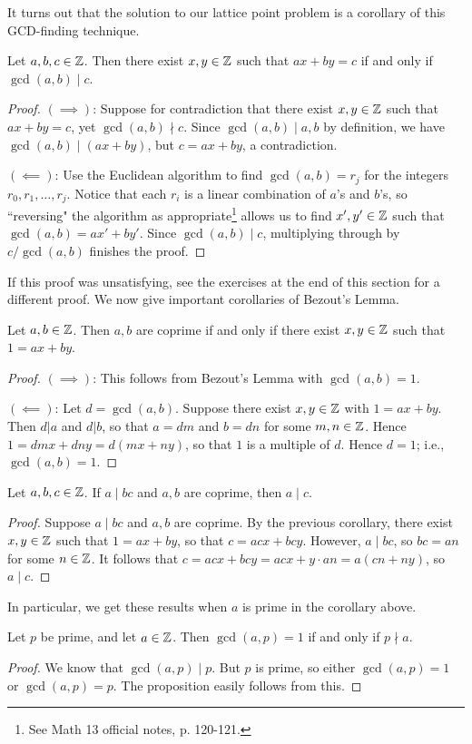 \documentclass{article}
\begin{document}
It turns out that the solution to our lattice point problem is a corollary of this GCD-finding technique.
\begin{theorem}
Let $a,b,c\in \mathbb Z$. Then there exist $x,y\in\mathbb Z$ such that $ax + by = c$ if and only if $\gcd(a,b) \mid c$.
\end{theorem}
\begin{proof}
$(\implies)$: Suppose for contradiction that there exist $x,y\in\mathbb Z$ such that $ax+by= c$, yet $\gcd(a,b) \nmid c$. Since $\gcd(a,b)\mid a,b$ by definition, we have $\gcd(a,b)\mid (ax + by)$, but $c=ax+by$, a contradiction.

$(\impliedby)$: Use the Euclidean algorithm to find $\gcd(a,b) = r_j$ for the integers $r_0, r_1, \ldots, r_j$. Notice that each $r_i$ is a linear combination of $a$'s and $b$'s, so ``reversing" the algorithm as appropriate\footnote{See Math 13 official notes, p. 120-121.} allows us to find $x',y'\in \mathbb Z$ such that $\gcd(a,b) = ax'+by'$. Since $\gcd(a,b)\mid c$, multiplying through by $c/\gcd(a,b)$ finishes the proof.
\end{proof}

If this proof was unsatisfying, see the exercises at the end of this section for a different proof. We now give important corollaries of Bezout's Lemma.

\begin{corollary}
Let $a,b\in\mathbb Z$. Then $a,b$ are coprime if and only if there exist $x,y\in\mathbb Z$ such that $1 = ax+by$.
\end{corollary}
\begin{proof}
$(\implies)$: This follows from Bezout's Lemma with $\gcd(a,b) = 1$.

$(\impliedby)$: Let $d = \gcd(a,b)$. Suppose there exist $x,y\in\mathbb Z$ with $1 = ax + by$. Then $d|a$ and $d|b$, so that $a = dm$ and $b=dn$ for some $m,n \in\mathbb Z$. Hence $1 = dmx + dny = d(mx + ny)$, so that $1$ is a multiple of $d$. Hence $d=1$; i.e., $\gcd(a,b) = 1$.
\end{proof}

\begin{corollary}\label{euclid1}
Let $a,b,c\in\mathbb Z$. If $a \mid bc$ and $a,b$ are coprime, then $a\mid c$.
\end{corollary}
\begin{proof}
Suppose $a\mid bc$ and $a,b$ are coprime. By the previous corollary, there exist $x,y\in\mathbb Z$ such that $1 = ax + by$, so that $c = acx + bcy$. However, $a\mid bc$, so $bc = an$ for some $n\in\mathbb Z$. It follows that $c = acx  +bcy = acx + y\cdot an = a(cn + ny)$, so $a\mid c$.
\end{proof}
In particular, we get these results when $a$ is prime in the corollary above.
\begin{proposition}
Let $p$ be prime, and let $a\in\mathbb Z$. Then $\gcd(a, p) = 1$ if and only if $p\nmid a$.
\end{proposition}
\begin{proof}
We know that $\gcd(a, p) \mid p$. But $p$ is prime, so either $\gcd(a,p) = 1$ or $\gcd(a, p) = p$. The proposition easily follows from this.
\end{proof}
\end{document}
